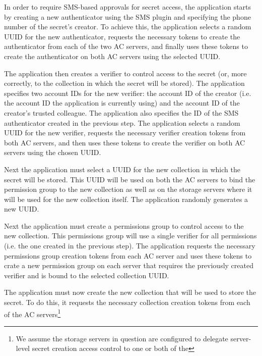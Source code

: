 \begin{packed_enum}
\item In order to require SMS-based approvals for secret access, the
  application starts by creating a new authenticator using the SMS
  plugin and specifying the phone number of the secret's creator. To
  achieve this, the application selects a random UUID for the new
  authenticator, requests the necessary tokens to create the
  authenticator from each of the two AC servers, and finally uses
  these tokens to create the authenticator on both AC servers using
  the selected UUID.
\item The application then creates a verifier to control access to the
  secret (or, more correctly, to the collection in which the secret
  will be stored). The application specifies two account IDs for the
  new verifier: the account ID of the creator (i.e. the account ID the
  application is currently using) and the account ID of the creator's
  trusted colleague. The application also specifies the ID of the SMS
  authenticator created in the previous step. The application selects
  a random UUID for the new verifier, requests the necessary verifier
  creation tokens from both AC servers, and then uses these tokens to
  create the verifier on both AC servers using the chosen UUID.
\item Next the application must select a UUID for the new collection in
  which the secret will be stored. This UUID will be used on both the AC
  servers to bind the permission group to the new collection as well
  as on the storage servers where it will be used for the new
  collection itself. The application randomly generates a new UUID.
\item Next the application must create a permissions group to control
  access to the new collection. This permissions group will use a
  single verifier for all permissions (i.e. the one created in the
  previous step). The application requests the necessary permissions
  group creation tokens from each AC server and uses these tokens to
  crate a new permission group on each server that requires the
  previously created verifier and is bound to the selected collection
  UUID.
\item The application must now create the new collection that will be
  used to store the secret. To do this, it requests the necessary
  collection creation tokens from each of the AC servers\footnote{We
    assume the storage servers in question are configured to delegate
    server-level secret creation access control to one or both of the
}
\end{packed_enum}
